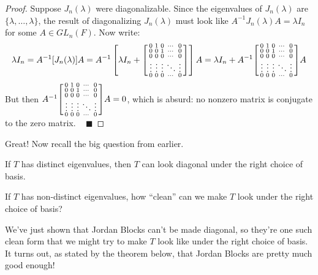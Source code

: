 \begin{proof}
    Suppose $J_n(\lambda)$ were diagonalizable.  Since the eigenvalues of $J_n(\lambda)$ are $\{\lambda, \dots, \lambda\}$, the result of diagonalizing $J_n(\lambda)$ must look like $A^{-1}J_n(\lambda )A = \lambda I_n$ for some $A \in GL_n(F)$.  Now write:
    \[ \lambda I_n = A^{-1}[J_n(\lambda)] A = A^{-1}\left [ \lambda I_n + \begin{bsmallmatrix} 0 & 1 & 0 & \cdots & 0 \\ 0 & 0 & 1 & \cdots & 0 \\ 0 & 0 & 0 & \cdots & 0 \\ \vdots & \vdots & \vdots & \ddots & \vdots \\ 0 & 0 & 0 & \cdots & 0 \end{bsmallmatrix}\right ] A = \lambda I_n + A^{-1}\begin{bsmallmatrix} 0 & 1 & 0 & \cdots & 0 \\ 0 & 0 & 1 & \cdots & 0 \\ 0 & 0 & 0 & \cdots & 0 \\ \vdots & \vdots & \vdots & \ddots & \vdots \\ 0 & 0 & 0 & \cdots & 0 \end{bsmallmatrix}A \]
    But then $A^{-1}\begin{bsmallmatrix} 0 & 1 & 0 & \cdots & 0 \\ 0 & 0 & 1 & \cdots & 0 \\ 0 & 0 & 0 & \cdots & 0 \\ \vdots & \vdots & \vdots & \ddots & \vdots \\ 0 & 0 & 0 & \cdots & 0 \end{bsmallmatrix}A = 0$, which is absurd: no nonzero matrix is conjugate to the zero matrix. ~ $\blacksquare$
\end{proof}

Great!  Now recall the big question from earlier.

\begin{boxed-text}[44em]

If $T$ has distinct eigenvalues, then $T$ can look diagonal under the right choice of basis.

If $T$ has non-distinct eigenvalues, how ``clean'' can we make $T$ look under the right choice of basis?

\end{boxed-text}

We've just shown that Jordan Blocks can't be made diagonal, so they're one such clean form that we might try to make $T$ look like under the right choice of basis.  It turns out, as stated by the theorem below, that Jordan Blocks are pretty much good enough!

